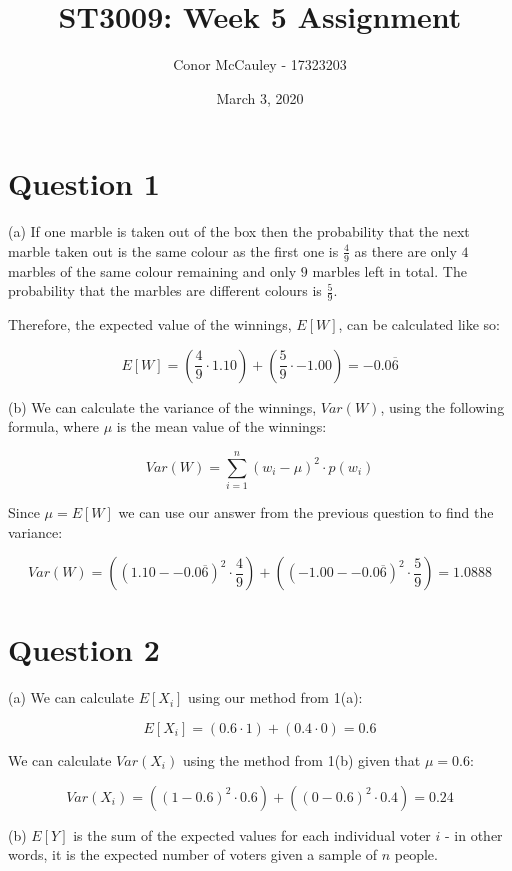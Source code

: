 \documentclass[12pt]{article}
\title{ST3009: Week 5 Assignment}
\author{Conor McCauley - 17323203}
\date{March 3, 2020}
\begin{document}
\maketitle

\section*{Question 1}

\noindent (a) If one marble is taken out of the box then the probability that the next marble taken out is the same colour as the first one is $\frac{4}{9}$ as there are only $4$ marbles of the same colour remaining and only $9$ marbles left in total. The probability that the marbles are different colours is $\frac{5}{9}$. 

\indent Therefore, the expected value of the winnings, $E[W]$, can be calculated like so:

$$
E[W] = \left( \frac{4}{9} \cdot 1.10 \right) + \left( \frac{5}{9} \cdot -1.00 \right) = -0.0\overline{6}
$$

\noindent (b) We can calculate the variance of the winnings, $Var(W)$, using the following formula, where $\mu$ is the mean value of the winnings:

$$
Var(W) = \sum_{i=1}^n (w_i - \mu)^2 \cdot p(w_i)
$$

\indent Since $\mu = E[W]$ we can use our answer from the previous question to find the variance:

$$
Var(W) = \left( (1.10 - -0.0\overline{6})^2 \cdot \frac{4}{9} \right) + \left( (-1.00 - -0.0\overline{6})^2 \cdot \frac{5}{9} \right) = 1.0888
$$

\section*{Question 2}

\noindent (a) We can calculate $E[X_i]$ using our method from 1(a):

$$
E[X_i] = (0.6 \cdot 1) + (0.4 \cdot 0) = 0.6
$$

\indent We can calculate $Var(X_i)$ using the method from 1(b) given that $\mu = 0.6$:

$$
Var(X_i) = \left( (1 - 0.6)^2 \cdot 0.6 \right) + \left( (0 - 0.6)^2 \cdot 0.4 \right) = 0.24
$$

\noindent (b) $E[Y]$ is the sum of the expected values for each individual voter $i$ - in other words, it is the expected number of voters given a sample of $n$ people.
\end{document}
